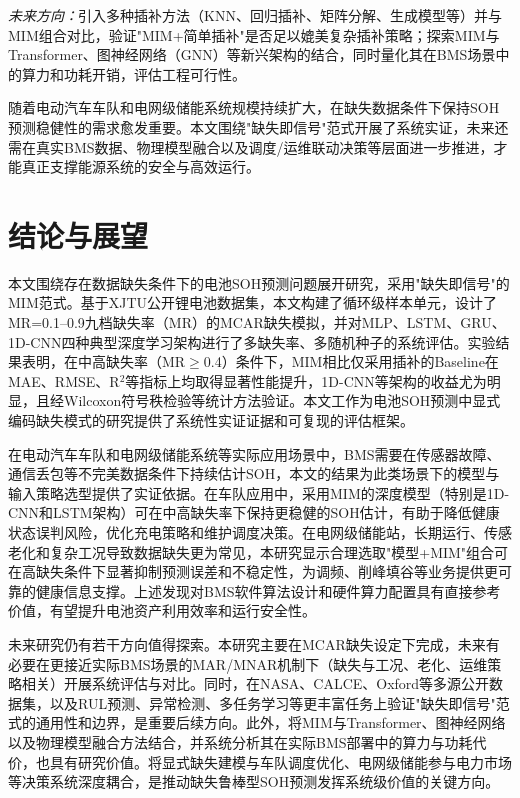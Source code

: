 \documentclass[10pt,a4paper]{ctexart}
\begin{document}
\textit{未来方向：}引入多种插补方法（KNN、回归插补、矩阵分解、生成模型等）并与MIM组合对比，验证"MIM+简单插补"是否足以媲美复杂插补策略；探索MIM与Transformer、图神经网络（GNN）等新兴架构的结合，同时量化其在BMS场景中的算力和功耗开销，评估工程可行性。

随着电动汽车车队和电网级储能系统规模持续扩大，在缺失数据条件下保持SOH预测稳健性的需求愈发重要。本文围绕"缺失即信号"范式开展了系统实证，未来还需在真实BMS数据、物理模型融合以及调度/运维联动决策等层面进一步推进，才能真正支撑能源系统的安全与高效运行。


\section{结论与展望}\label{sec:conclusion}

本文围绕存在数据缺失条件下的电池SOH预测问题展开研究，采用"缺失即信号"的MIM范式。基于XJTU公开锂电池数据集，本文构建了循环级样本单元，设计了MR=0.1--0.9九档缺失率（MR）的MCAR缺失模拟，并对MLP、LSTM、GRU、1D-CNN四种典型深度学习架构进行了多缺失率、多随机种子的系统评估。实验结果表明，在中高缺失率（MR$\geq$0.4）条件下，MIM相比仅采用插补的Baseline在MAE、RMSE、R$^2$等指标上均取得显著性能提升，1D-CNN等架构的收益尤为明显，且经Wilcoxon符号秩检验等统计方法验证。本文工作为电池SOH预测中显式编码缺失模式的研究提供了系统性实证证据和可复现的评估框架。

在电动汽车车队和电网级储能系统等实际应用场景中，BMS需要在传感器故障、通信丢包等不完美数据条件下持续估计SOH，本文的结果为此类场景下的模型与输入策略选型提供了实证依据。在车队应用中，采用MIM的深度模型（特别是1D-CNN和LSTM架构）可在中高缺失率下保持更稳健的SOH估计，有助于降低健康状态误判风险，优化充电策略和维护调度决策。在电网级储能站，长期运行、传感老化和复杂工况导致数据缺失更为常见，本研究显示合理选取"模型+MIM"组合可在高缺失条件下显著抑制预测误差和不稳定性，为调频、削峰填谷等业务提供更可靠的健康信息支撑。上述发现对BMS软件算法设计和硬件算力配置具有直接参考价值，有望提升电池资产利用效率和运行安全性。

未来研究仍有若干方向值得探索。本研究主要在MCAR缺失设定下完成，未来有必要在更接近实际BMS场景的MAR/MNAR机制下（缺失与工况、老化、运维策略相关）开展系统评估与对比。同时，在NASA、CALCE、Oxford等多源公开数据集，以及RUL预测、异常检测、多任务学习等更丰富任务上验证"缺失即信号"范式的通用性和边界，是重要后续方向。此外，将MIM与Transformer、图神经网络以及物理模型融合方法结合，并系统分析其在实际BMS部署中的算力与功耗代价，也具有研究价值。将显式缺失建模与车队调度优化、电网级储能参与电力市场等决策系统深度耦合，是推动缺失鲁棒型SOH预测发挥系统级价值的关键方向。
\end{document}
